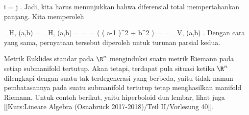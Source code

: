 {\mavergleichskette
{\vergleichskette
{ i
}
{ = }{ j
}
{  }{
}
{    }{
}
{   }{
}
}
{}{}{.}
Jadi, kita harus menunjukkan bahwa diferensial total mempertahankan panjang. Kita memperoleh

\mavergleichskettealigndrucklinks
{\vergleichskettealigndrucklinks
{  \Vert_{H, \psi(a,b) }
}
{ =} {  \Vert_{H, \psi(a,b) }
}
{ =} { {  }  \Vert
}
{ =} { {  } 
}
{ =} { {  } \left(  \left(  a-1  \right)^2 + b^2   \right)
}
}
{
\vergleichskettefortsetzungalign
{ =} { {  }
}
{ =} {  \Vert_{V, (a,b)}
}
{ } {}
{ } {}
}{}{.}
Dengan cara yang sama, pernyataan tersebut diperoleh untuk turunan parsial kedua.

}

Metrik Euklides standar pada $\R^n$ menginduksi suatu metrik Riemann pada setiap submanifold tertutup. Akan tetapi, terdapat pula situasi ketika $\R^n$ dilengkapi dengan suatu
tak terdegenerasi yang berbeda, yaitu tidak
namun pembatasannya pada suatu submanifold tertutup tetap menghasilkan manifold Riemann. Untuk contoh berikut, yaitu hiperboloid dua lembar, lihat juga [[Kurs:Lineare Algebra (Osnabrück 2017-2018)/Teil II/Vorlesung 40]].

